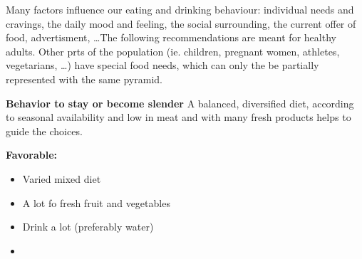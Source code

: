 \documentclass[../main.tex]{subfiles}
\begin{document}
Many factors influence our eating and drinking behaviour: individual needs and cravings, the daily mood and feeling, the social surrounding,
the current offer of food, advertisment, \ldots The following recommendations are meant for healthy adults.
Other prts of the population (ie. children, pregnant women, athletes, vegetarians, \ldots) have special food needs,
which can only the be partially represented with the same pyramid.


\vspace{5mm}
\noindent
\begin{fminipage}{\textwidth}
  \textbf{Behavior to stay or become slender}
  A balanced, diversified diet, according to seasonal availability and low in meat and with many fresh products helps to guide the choices.

  \textbf{Favorable:}
  \begin{itemize}
  \item Varied mixed diet
  \item A lot fo fresh fruit and vegetables
  \item Drink a lot (preferably water)
    \item 
  \end{itemize}
  
\end{fminipage}
\end{document}
